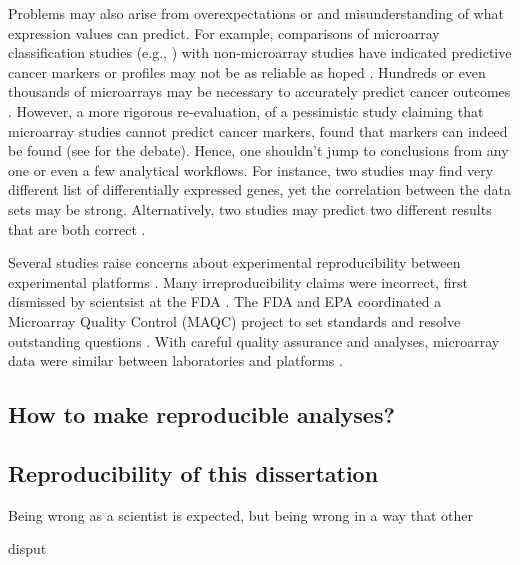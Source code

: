 Problems may also arise from overexpectations or and misunderstanding 
of what expression values can predict. 
For example, comparisons of microarray classification
studies (e.g., \cite{Veer:2002vv,Yeoh:2002wg,Alizadeh:2000tn,Golub:1999fn,
Perou:1999fr,Wang:2005uu,VanDeVijver:2002wj,Rosenwald:2002eg,Beer:2002uy,
Bhattacharjee:2001dt,Ramaswamy:2003to,Pomeroy:2002wx,Iizuka:2003wo})
with non-microarray studies have indicated predictive cancer markers or profiles
may not be as reliable as hoped \cite{Miklos:2004wn,Michiels:2007vs,Koscielny:2010gg,Eden:2004ua}.
Hundreds or even thousands of microarrays may be necessary to
accurately predict cancer 
outcomes \cite{Ioannidis:2005kd,Michiels:2005tg,EinDor:2006ga,Frantz:2005ur}.
However, a more rigorous re-evaluation, of a pessimistic study claiming
that microarray studies cannot predict cancer markers, found that
markers can indeed be found (see \cite{Michiels:2005tg,Fan:2010cv,Tong:2010ka,Koscielny:2010jd}
for the debate).
Hence, one shouldn't jump to conclusions from any one or even a few
analytical workflows.
For instance, two studies may find very different
list of differentially expressed genes, yet the correlation
between the data sets may be strong. Alternatively, two studies may
predict two different results that are both correct \cite{Zhang:2008bk,Zhang:2009cy}.

Several studies 
raise concerns about experimental reproducibility between
experimental platforms \cite{Tan:2003be,Kuo:2002cl,
Mah:2004ia,Rogojina:2003te,Woo:2004wz,Li:2002cz,Kothapalli:2002gz}.
Many irreproducibility claims were incorrect, first
dismissed by scientsist at the FDA \cite{Shi:2005ik}.
The FDA and EPA coordinated a Microarray Quality Control (MAQC) project
to set standards and resolve outstanding questions 
\cite{Lesko:2004vi,Frueh:2006uy,Dix:2006ty,Shi:2004vh}.
With careful quality assurance and analyses,
microarray data were similar between 
laboratories \cite{Dobbin:2005wj,Irizarry:2005kb,Larkin:2005hb,
Ulrich:2004vw,Waring:2004vh,Weis:2005ut} and
platforms \cite{Petersen:2005by,Yauk:2004fq,
Park:2004ux,Yuen:2002ha,Canales:2006ts,Shippy:2006uf,
Patterson:2006hi,Tong:2006cg,Guo:2006wi}.

\subsection{How to make reproducible analyses?}

\subsection{Reproducibility of this dissertation}

Being wrong as a scientist is expected, but being wrong in a way
that other


disput




